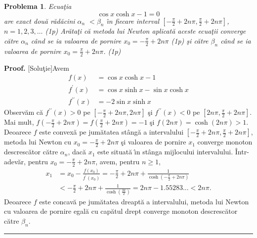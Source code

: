 \documentclass[a4paper]{article}%
\newtheorem{problem}[theorem]{Problema}
\newenvironment{proof}[1][Proof]{\noindent\textbf{#1.} }{\ \rule{0.5em}{0.5em}}
\begin{document}
\begin{problem}
\label{Gautschip4.30}Ecua\c{t}ia
\[
\cos x\cosh x-1=0
\]
are exact dou\u{a} r\u{a}d\u{a}cini $\alpha_{n}$ $<\beta_{n}$ \^{\i}n fiecare
interval $\left[  -\frac{\pi}{2}+2n\pi,\frac{\pi}{2}+2n\pi\right]  $,
$n=1,2,3,\dots$ (1p) Ar\u{a}ta\c{t}i c\u{a} metoda lui Newton aplicat\u{a}
aceste ecua\c{t}ii converge c\u{a}tre $\alpha_{n}$ c\^{a}nd se ia valoarea de
pornire $x_{0}=-\frac{\pi}{2}+2n\pi$ (1p) \c{s}i c\u{a}tre $\beta_{n}$
c\^{a}nd se ia valoarea de pornire $x_{0}=\frac{\pi}{2}+2n\pi$. (1p)
\end{problem}

\begin{proof}
[Solu\c{t}ie]Avem%
\begin{align*}
f(x) &  =\cos x\cosh x-1\\
f^{\prime}(x) &  =\cos x\sinh x-\sin x\cosh x\\
f^{\prime\prime}(x) &  =-2\sin x\sinh x
\end{align*}
Observ\u{a}m c\u{a}  $f^{\prime\prime}(x)>0$ pe $\left[  -\frac{\pi}{2}%
+2n\pi,2n\pi\right]  $ \c{s}i $f^{\prime\prime}(x)<0$ pe $\left[  2n\pi
,\frac{\pi}{2}+2n\pi\right]  $. Mai mult, $f\left(  -\frac{\pi}{2}%
+2n\pi\right)  =f\left(  \frac{\pi}{2}+2n\pi\right)  =-1$ \c{s}i
$f(2n\pi)=\cosh(2n\pi)>1$. Deoarece $f$ este convex\u{a} pe jum\u{a}tatea
st\^{a}ng\u{a} a intervalului $\left[  -\frac{\pi}{2}+2n\pi,\frac{\pi}%
{2}+2n\pi\right]  $, metoda lui Newton cu  $x_{0}=-\frac{\pi}{2}+2n\pi$ \c{s}i
valoarea de pornire $x_{1}$ converge monoton descresc\u{a}tor c\u{a}tre
$\alpha_{n}$, dac\u{a} $x_{1}$ este situat\u{a} \^{\i}n st\^{a}nga mijlocului
intervalului. \^{I}ntr-adev\u{a}r, pentru $x_{0}=-\frac{\pi}{2}+2n\pi$, avem,
pentru $n\geq1$,
\begin{align*}
x_{1} &  =x_{0}-\frac{f(x_{0})}{f^{\prime}(x_{0})}=-\frac{\pi}{2}+2n\pi
+\frac{1}{\cosh\left(  -\frac{\pi}{2}+2n\pi\right)  }\\
&  <-\frac{\pi}{2}+2n\pi+\frac{1}{\cosh\left(  \frac{3\pi}{2}\right)  }%
=2n\pi-1.55283...<2n\pi.
\end{align*}
Deoarece $f$ este concav\u{a} pe jum\u{a}tatea dreapt\u{a} a intervalului,
metoda lui Newton cu valoarea de pornire egal\u{a} cu cap\u{a}tul drept
converge monoton descresc\u{a}tor c\u{a}tre  $\beta_{n}$.
\end{proof}
\end{document}
